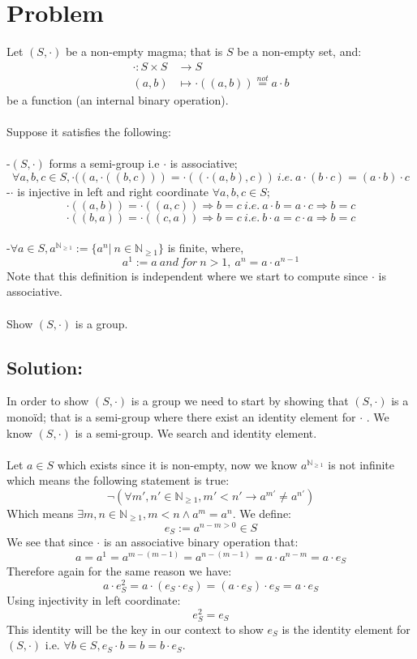 \documentclass[11pt, a4paper, oneside]{article}
\newcommand{\problem}[1][]{\section{#1} \hfill \par}
\newcommand{\solution}[1][]{\subsection*{#1}\hfill \par}
\theoremstyle{remark}
\theoremstyle{lemma}
\begin{document}
\newpage
\problem[Problem]
Let $(S,\cdot)$ be a non-empty magma; that is $S$ be a non-empty set, and:
\begin{align*}
\cdot:S\times S &\longrightarrow S\\
(a,b) &\mapsto \cdot((a,b))\overset{not}{=}a\cdot b
\end{align*}
be a function (an internal binary operation).
\\\\
Suppose it satisfies the following:\\
\\
-$(S,\cdot)$ forms a semi-group i.e $\cdot$ is associative; $$\forall a,b,c\in S,\cdot((a,\cdot((b,c)))=\cdot((\cdot(a,b),c))\ i.e.\  a\cdot(b\cdot c)=(a\cdot b)\cdot c$$
-$\cdot$ is injective in left and right coordinate $\forall a,b,c\in S$;\\ $$\cdot((a,b))=\cdot((a,c))\Rightarrow b=c\ i.e.\  a\cdot b=a\cdot c\Rightarrow b=c$$ $$\cdot((b,a))=\cdot((c,a))\Rightarrow b=c\ i.e.\ b\cdot a=c\cdot a\Rightarrow b=c$$\\
-$\forall a\in S, a^{\mathbb{N}_{\geq 1}}:=\{a^n |\ n\in\mathbb{N}_{\geq 1}\}$ is finite, where,
$$a^1:=a\ and\ for\ n>1,\ a^n=a\cdot a^{n-1}$$
Note that this definition is independent where we start to compute since $\cdot$ is associative.\\\\
Show $(S,\cdot)$ is a group.
\solution[Solution:] 
In order to show $(S,\cdot)$ is a group we need to start by showing that $(S,\cdot)$ is a monoïd; that is a semi-group where there exist an identity element for $\cdot$ .
We know $(S,\cdot)$ is a semi-group. We search and identity element.\\\\
Let $a\in S$ which exists since it is non-empty, now we know $a^{\mathbb{N}_{\geq 1}}$ is not infinite which means the following statement is true:
$$
\neg(\forall m',n'\in\mathbb{N}_{\geq 1}, m'< n'\rightarrow a^{m'}\neq a^{n'})
$$
Which means $\exists m,n\in\mathbb{N}_{\geq 1}, m< n\wedge a^m=a^n$. We define:
$$e_S:=a^{n-m>0}\in S$$
We see that since $\cdot$ is an associative binary operation that: $$a=a^1=a^{m-(m-1)}=a^{n-(m-1)}=a\cdot a^{n-m}=a\cdot e_S$$
Therefore again for the same reason we have:  
$$a\cdot e_S^2=a\cdot (e_S\cdot e_S)=(a\cdot e_S)\cdot e_S=a\cdot e_S$$
Using injectivity in left coordinate:
$$e_S^2=e_S$$
This identity will be the key in our context to show $e_S$ is the identity element for $(S,\cdot)$ i.e. $\forall b\in S, e_S\cdot b=b=b\cdot e_S$.\\\\
\end{document}
